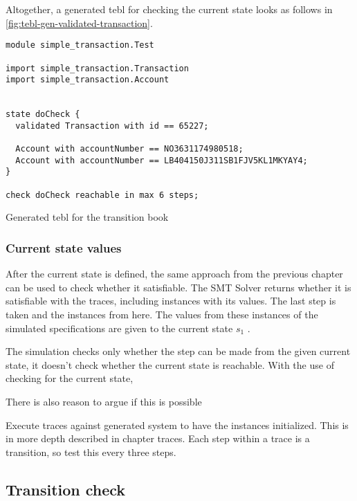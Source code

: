 Altogether, a generated tebl for checking the current state looks as follows in
\autoref{fig:tebl-gen-validated-transaction}.

\begin{sourcecode}[h!]
\begin{lstlisting}[]
module simple_transaction.Test

import simple_transaction.Transaction
import simple_transaction.Account


state doCheck {
  validated Transaction with id == 65227;

  Account with accountNumber == NO3631174980518;
  Account with accountNumber == LB404150J311SB1FJV5KL1MKYAY4;
}

check doCheck reachable in max 6 steps;
\end{lstlisting}
\caption{Generated tebl for the transition book}
\label{fig:tebl-gen-validated-transaction}
\end{sourcecode}

\subsubsection*{Current state values}
After the current state is defined, the same approach from the previous chapter
can be used to check whether it satisfiable. The SMT Solver returns whether it
is satisfiable with the traces, including instances with its values. The last
step is taken and the instances from here. The values from these instances of
the simulated specifications are given to the current state $s_{1}$
.

The simulation checks only whether the step can be made from the given current
state, it doesn't check whether the current state is reachable. With the use of
checking for the current state,


There is also reason to argue if this is possible



Execute traces against generated system to have the instances initialized. This
is in more depth described in chapter traces. Each step within a trace is a
transition, so test this every three steps.

\subsection{Transition check}

